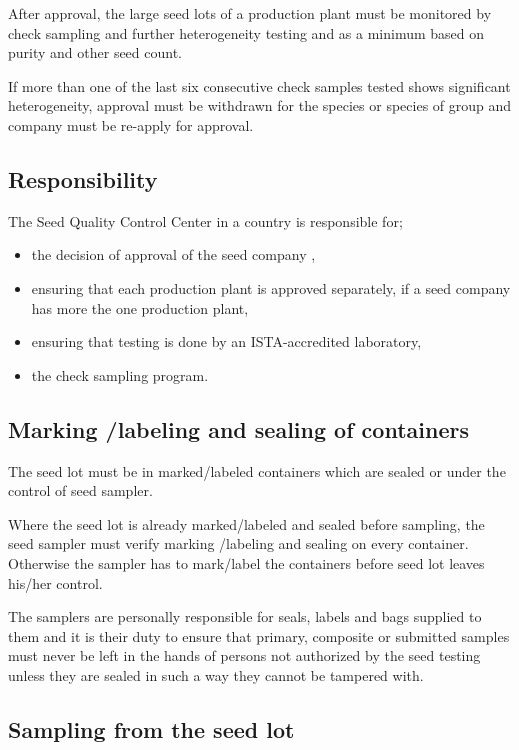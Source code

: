 \documentclass[]{book}
\providecommand{\tightlist}{%
  \setlength{\itemsep}{0pt}\setlength{\parskip}{0pt}}
\begin{document}
After approval, the large seed lots of a production plant must be
monitored by check sampling and further heterogeneity testing and as a
minimum based on purity and other seed count.

If more than one of the last six consecutive check samples tested shows
significant heterogeneity, approval must be withdrawn for the species or
species of group and company must be re-apply for approval.

\subsection{Responsibility}\label{responsibility}

The Seed Quality Control Center in a country is responsible for;

\begin{itemize}
\tightlist
\item
  the decision of approval of the seed company ,
\item
  ensuring that each production plant is approved separately, if a seed
  company has more the one production plant,
\item
  ensuring that testing is done by an ISTA-accredited laboratory,
\item
  the check sampling program.
\end{itemize}

\subsection{Marking /labeling and sealing of
containers}\label{marking-labeling-and-sealing-of-containers}

The seed lot must be in marked/labeled containers which are sealed or
under the control of seed sampler.

Where the seed lot is already marked/labeled and sealed before sampling,
the seed sampler must verify marking /labeling and sealing on every
container. Otherwise the sampler has to mark/label the containers before
seed lot leaves his/her control.

The samplers are personally responsible for seals, labels and bags
supplied to them and it is their duty to ensure that primary, composite
or submitted samples must never be left in the hands of persons not
authorized by the seed testing unless they are sealed in such a way they
cannot be tampered with.

\subsection{Sampling from the seed
lot}\label{sampling-from-the-seed-lot}
\end{document}
